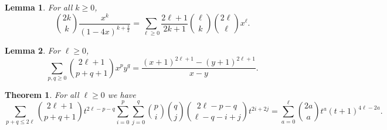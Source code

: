 \documentclass[10pt,a4paper]{amsart}
\newtheorem{lem}{Lemma}
\newtheorem{thm}{Theorem}
\begin{document}
\begin{lem} \label{hodai2}
For all $k \geq 0$,
\[
    \binom{2k}{k}\frac{x^k}{(1-4x)^{k+\frac{3}{2}}} = \sum_{\ell \ge 0} \frac{2\ell+1}{2k+1}\binom{\ell}{k}\binom{2\ell}{\ell}x^\ell.
\]  
\end{lem}

\begin{lem} \label{hodai3}
For $\ell \geq 0$,
\[
    \sum_{p,q \ge 0}\binom{2 \ell +1}{p+q+1} x^p y^q = \frac{(x+1)^{2\ell+1} - (y+1)^{2\ell+1}}{x-y}.
\]
\end{lem}

\begin{thm}\label{thm: f to gamma}
For all $\ell \geq 0$ we have
    \[\sum_{p+q \le 2 \ell} \binom{2 \ell +1}{p+q+1}t^{2\ell -p-q} \sum_{i=0}^p \sum_{j=0}^q  \binom{p}{i} \binom{q}{j}\binom{2\ell -p-q}{\ell -q-i+j} t^{2i + 2j} = \sum_{a=0}^\ell \binom{2a}{a} t^a (t+1)^{4\ell -2a}.
    \]
\end{thm}
\end{document}
